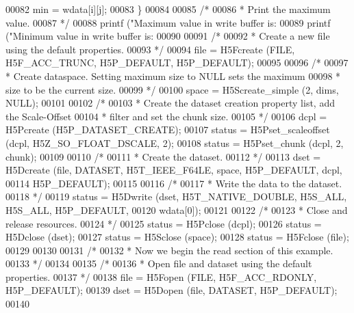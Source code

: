 \begin{DoxyCode}
00082                 min = wdata[i][j];
00083         \}
00084 
00085     \textcolor{comment}{/*}
00086 \textcolor{comment}{     * Print the maximum value.}
00087 \textcolor{comment}{     */}
00088     printf (\textcolor{stringliteral}{"Maximum value in write buffer is: %
00089     printf (\textcolor{stringliteral}{"Minimum value in write buffer is: %
00090 
00091     \textcolor{comment}{/*}
00092 \textcolor{comment}{     * Create a new file using the default properties.}
00093 \textcolor{comment}{     */}
00094     file = H5Fcreate (FILE, H5F\_ACC\_TRUNC, H5P\_DEFAULT, H5P\_DEFAULT);
00095 
00096     \textcolor{comment}{/*}
00097 \textcolor{comment}{     * Create dataspace.  Setting maximum size to NULL sets the maximum}
00098 \textcolor{comment}{     * size to be the current size.}
00099 \textcolor{comment}{     */}
00100     space = H5Screate\_simple (2, dims, NULL);
00101 
00102     \textcolor{comment}{/*}
00103 \textcolor{comment}{     * Create the dataset creation property list, add the Scale-Offset}
00104 \textcolor{comment}{     * filter and set the chunk size.}
00105 \textcolor{comment}{     */}
00106     dcpl = H5Pcreate (H5P\_DATASET\_CREATE);
00107     status = H5Pset\_scaleoffset (dcpl, H5Z\_SO\_FLOAT\_DSCALE, 2);
00108     status = H5Pset\_chunk (dcpl, 2, chunk);
00109 
00110     \textcolor{comment}{/*}
00111 \textcolor{comment}{     * Create the dataset.}
00112 \textcolor{comment}{     */}
00113     dset = H5Dcreate (file, DATASET, H5T\_IEEE\_F64LE, space, H5P\_DEFAULT, dcpl,
00114                 H5P\_DEFAULT);
00115 
00116     \textcolor{comment}{/*}
00117 \textcolor{comment}{     * Write the data to the dataset.}
00118 \textcolor{comment}{     */}
00119     status = H5Dwrite (dset, H5T\_NATIVE\_DOUBLE, H5S\_ALL, H5S\_ALL, H5P\_DEFAULT,
00120                 wdata[0]);
00121 
00122     \textcolor{comment}{/*}
00123 \textcolor{comment}{     * Close and release resources.}
00124 \textcolor{comment}{     */}
00125     status = H5Pclose (dcpl);
00126     status = H5Dclose (dset);
00127     status = H5Sclose (space);
00128     status = H5Fclose (file);
00129 
00130 
00131     \textcolor{comment}{/*}
00132 \textcolor{comment}{     * Now we begin the read section of this example.}
00133 \textcolor{comment}{     */}
00134 
00135     \textcolor{comment}{/*}
00136 \textcolor{comment}{     * Open file and dataset using the default properties.}
00137 \textcolor{comment}{     */}
00138     file = H5Fopen (FILE, H5F\_ACC\_RDONLY, H5P\_DEFAULT);
00139     dset = H5Dopen (file, DATASET, H5P\_DEFAULT);
00140 
}}
\end{DoxyCode}
